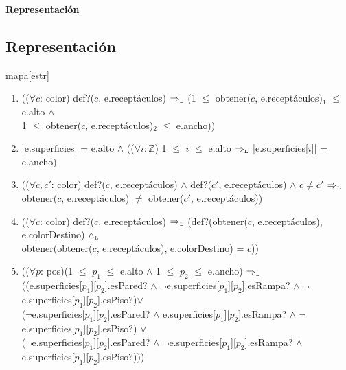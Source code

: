 \documentclass[a4paper,10pt]{article}
\newenvironment{Representacion}{%
  \vspace*{2ex}%
  \noindent\textbf{\Large Representación}%
  \vspace*{2ex}%
}{}
\begin{document}
\begin{Representacion}

\subsection{Representación} 

\begin{Estructura}{mapa}[estr]
    \begin{Tupla}[estr]%
    \end{Tupla}
  \end{Estructura}
  
  \begin{enumerate}
      \item (($\forall c$: color) def?($c$, e.receptáculos) $\Rightarrow_{\mathrm{\scriptscriptstyle{L}}}$ (1 $\leq$ obtener($c$,  e.receptáculos)$_{1}$ $\leq$ e.alto $\land$ \\ 
      1 $\leq$ obtener($c$, e.receptáculos)$_{2}$ $\leq$ e.ancho))
            
      \item |e.superficies| = e.alto $\land$ (($\forall i: \mathbb Z$) 1 $\leq$ $i$ $\leq$ e.alto $\Rightarrow_{\mathrm{\scriptscriptstyle{L}}}$  |e.superficies[$i$]| = e.ancho)
      
      \item (($\forall c, c'$: color) def?($c$, e.receptáculos) $\land$ def?($c'$, e.receptáculos) $\land$ $c \neq c'$ $\Rightarrow_{\mathrm{\scriptscriptstyle{L}}}$ \\
        obtener($c$, e.receptáculos) $\neq$ obtener($c'$, e.receptáculos))
        
      \item (($\forall c$: color) def?($c$, e.receptáculos) $\Rightarrow_{\mathrm{\scriptscriptstyle{L}}}$ (def?(obtener($c$, e.receptáculos), e.colorDestino) $\land_{\mathrm{\scriptscriptstyle{L}}}$ \\
            obtener(obtener($c$, e.receptáculos), e.colorDestino) = $c$))
            
      \item (($\forall p$: pos)(1 $\leq$ $p_{1}$ $\leq$ e.alto $\land$ 1 $\leq$ $p_{2}$ $\leq$ e.ancho) $\Rightarrow_{\mathrm{\scriptscriptstyle{L}}}$ \\
            ((e.superficies[$p_{1}$][$p_{2}$].esPared? $\land$ $\neg$e.superficies[$p_{1}$][$p_{2}$].esRampa? $\land$ $\neg$e.superficies[$p_{1}$][$p_{2}$].esPiso?)$\lor$ \\
            ($\neg$e.superficies[$p_{1}$][$p_{2}$].esPared? $\land$ e.superficies[$p_{1}$][$p_{2}$].esRampa? $\land$ $\neg$e.superficies[$p_{1}$][$p_{2}$].esPiso?) $\lor$ \\
            ($\neg$e.superficies[$p_{1}$][$p_{2}$].esPared? $\land$ $\neg$e.superficies[$p_{1}$][$p_{2}$].esRampa? $\land$ e.superficies[$p_{1}$][$p_{2}$].esPiso?)))
            

\end{enumerate}
\end{Representacion}
\end{document}
